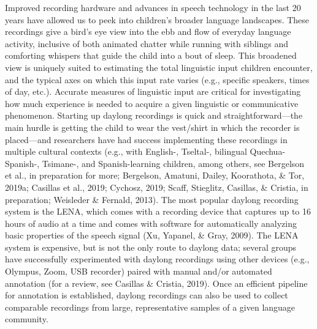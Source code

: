 \documentclass[,man,mask,floatsintext]{apa6}
\begin{document}
Improved recording hardware and advances in speech technology in the
last 20 years have allowed us to peek into children's broader language
landscapes. These recordings give a bird's eye view into the ebb and
flow of everyday language activity, inclusive of both animated chatter
while running with siblings and comforting whispers that guide the child
into a bout of sleep. This broadened view is uniquely suited to
estimating the total linguistic input children encounter, and the
typical axes on which this input rate varies (e.g., specific speakers,
times of day, etc.). Accurate measures of linguistic input are critical
for investigating how much experience is needed to acquire a given
linguistic or communicative phenomenon. Starting up daylong recordings
is quick and straightforward---the main hurdle is getting the child to
wear the vest/shirt in which the recorder is placed---and researchers
have had success implementing these recordings in multiple cultural
contexts (e.g., with English-, Tseltal-, bilingual Quechua-Spanish-,
Tsimane-, and Spanish-learning children, among others, see Bergelson et
al., in preparation for more; Bergelson, Amatuni, Dailey, Koorathota, \&
Tor, 2019a; Casillas et al., 2019; Cychosz, 2019; Scaff, Stieglitz,
Casillas, \& Cristia, in preparation; Weisleder \& Fernald, 2013). The
most popular daylong recording system is the LENA, which comes with a
recording device that captures up to 16 hours of audio at a time and
comes with software for automatically analyzing basic properties of the
speech signal (Xu, Yapanel, \& Gray, 2009). The LENA system is
expensive, but is not the only route to daylong data; several groups
have successfully experimented with daylong recordings using other
devices (e.g., Olympus, Zoom, USB recorder) paired with manual and/or
automated annotation (for a review, see Casillas \& Cristia, 2019). Once
an efficient pipeline for annotation is established, daylong recordings
can also be used to collect comparable recordings from large,
representative samples of a given language community.
\end{document}
